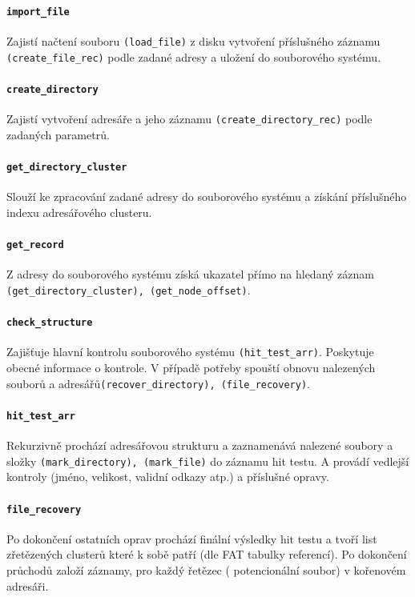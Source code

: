 \documentclass[12pt]{article}
\begin{document}
\paragraph{\texttt{import\_file}}
Zajistí načtení souboru \texttt{(load\_file)} z disku vytvoření příslušného záznamu \texttt{(create\_file\_rec)} podle zadané adresy a uložení do souborového systému.

\paragraph{\texttt{create\_directory}}
Zajistí vytvoření adresáře a jeho záznamu \texttt{(create\_directory\_rec)} podle zadaných parametrů.

\paragraph{\texttt{get\_directory\_cluster}}
Slouží ke zpracování zadané adresy do souborového systému a získání příslušného indexu adresářového clusteru.

\paragraph{\texttt{get\_record}}
Z adresy do souborového systému získá ukazatel přímo na hledaný záznam \texttt{(get\_directory\_cluster), (get\_node\_offset)}.

\paragraph{\texttt{check\_structure}}
Zajišťuje hlavní kontrolu souborového systému \texttt{(hit\_test\_arr)}. Poskytuje obecné informace o kontrole. V případě potřeby spouští obnovu nalezených souborů a adresářů\texttt{(recover\_directory), (file\_recovery)}.

\paragraph{\texttt{hit\_test\_arr}}
Rekurzivně prochází adresářovou strukturu a zaznamenává nalezené soubory a složky \texttt{(mark\_directory), (mark\_file)} do záznamu hit testu. A provádí vedlejší kontroly (jméno, velikost, validní odkazy atp.) a příslušné opravy.

\paragraph{\texttt{file\_recovery}}
Po dokončení ostatních oprav prochází finální výsledky hit testu a tvoří list zřetězených clusterů které k sobě patří (dle FAT tabulky referencí). Po dokončení průchodů založí záznamy, pro každý řetězec ( potencionální soubor) v kořenovém adresáři.
\end{document}

